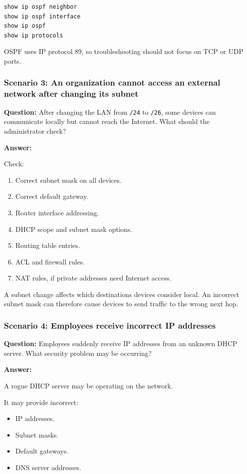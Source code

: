 \begin{lstlisting}
show ip ospf neighbor
show ip ospf interface
show ip ospf
show ip protocols
\end{lstlisting}

OSPF uses IP protocol 89, so troubleshooting should not focus on TCP or UDP ports.

\subsubsection*{Scenario 3: An organization cannot access an external network after changing its subnet}

\textbf{Question:} After changing the LAN from \texttt{/24} to \texttt{/26}, some devices can communicate locally but cannot reach the Internet. What should the administrator check?

\textbf{Answer:}

Check:

\begin{enumerate}
\item Correct subnet mask on all devices.
\item Correct default gateway.
\item Router interface addressing.
\item DHCP scope and subnet mask options.
\item Routing table entries.
\item ACL and firewall rules.
\item NAT rules, if private addresses need Internet access.
\end{enumerate}

A subnet change affects which destinations devices consider local. An incorrect subnet mask can therefore cause devices to send traffic to the wrong next hop.

\subsubsection*{Scenario 4: Employees receive incorrect IP addresses}

\textbf{Question:} Employees suddenly receive IP addresses from an unknown DHCP server. What security problem may be occurring?

\textbf{Answer:}

A rogue DHCP server may be operating on the network.

It may provide incorrect:

\begin{itemize}
\item IP addresses.
\item Subnet masks.
\item Default gateways.
\item DNS server addresses.
\end{itemize}

